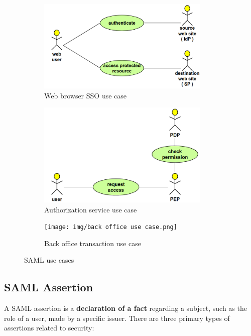 \begin{figure}[H]
  \centering
  \begin{subfigure}{.3\textwidth}
    \centering
    \includegraphics[width=0.9\textwidth]{img/sso use case.png}
    \caption{Web browser SSO use case}
  \end{subfigure}
  \begin{subfigure}{.3\textwidth}
    \centering
    \includegraphics[width=0.9\textwidth]{img/as use case.png}
    \caption{Authorization service use case}
  \end{subfigure}
  \begin{subfigure}{.3\textwidth}
    \centering
    \texttt{[image: img/back office use
    case.png]}
    \caption{Back office transaction use case}
  \end{subfigure}
  \caption{SAML use cases}
\end{figure}

\subsection{SAML Assertion}

A SAML assertion is a \textbf{declaration of a fact} regarding a
subject, such as the role of a user, made by a specific issuer. There
are three primary types of assertions related to security:

